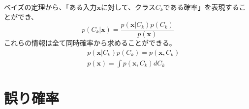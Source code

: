 \documentclass[a4j,twocolumn, uplatex]{jsarticle}
\begin{document}
ベイズの定理から、「ある入力$\bm{x}$に対して、クラス$C_k$である確率」を表現することができ、
\begin{equation}
  p(C_k|\bm{x}) = \frac{p(\bm{x}|C_k)p(C_k)}{p(\bm{x})}
\end{equation}
これらの情報は全て同時確率から求めることができる。
\begin{eqnarray}
  && p(\bm{x}|C_k)p(C_k) = p(\bm{x}, C_k) \\
  && p(\bm{x}) =  \int p(\bm{x}, C_k) dC_k
\end{eqnarray}

\section{誤り確率}
\end{document}
